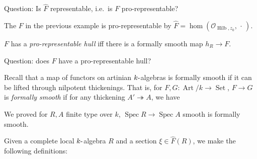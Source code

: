 \begin{center}
\end{center}

Question: Is \(\widehat{F}\) representable, i.e.~is \(F\)
pro-representable?

\begin{description}
\tightlist
\item[Example]
The \(F\) in the previous example is pro-representable by
\(\widehat{F} = \hom({\mathcal{O}}_{\operatorname{Hilb}, z_0}, {\,\cdot\,})\).
\item[Definition (Pro-representable Hull)]
\(F\) has a \emph{pro-representable hull} iff there is a formally smooth
map \(h_R \to F\).
\end{description}

Question: does \(F\) have a pro-representable hull?

Recall that a map of functors on artinian \(k{\hbox{-}}\)algebras is
formally smooth if it can be lifted through nilpotent thickenings. That
is, for \(F, G: \operatorname{Art}/k \to {\operatorname{Set}}\),
\(F \to G\) is \emph{formally smooth} if for any thickening
\(A' \twoheadrightarrow A\), we have

\begin{center}
\end{center}

We proved for \(R, A\) finite type over \(k\),
\(\operatorname{Spec}R \to \operatorname{Spec}A\) smooth is formally
smooth.

Given a complete local \(k{\hbox{-}}\)algebra \(R\) and a section
\(\xi \in \widehat{F}(R)\), we make the following definitions:

